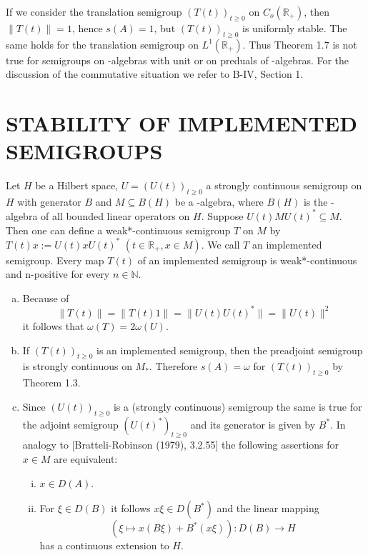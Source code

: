 \newpage

\begin{remark}\label{rem:d4-1.8}
If we consider the translation semigroup $(T(t))_{t \geq 0}$ on $C_{o}(\mathbb{R}_{+})$, then $\|T(t)\| = 1$, hence $s(A) = 1$, but $(T(t))_{t \geq 0}$ is uniformly stable.
The same holds for the translation semigroup on $L^1(\mathbb{R}_{+})$.
Thus Theorem 1.7 is not true for semigroups on \CA-algebras with unit or on preduals of \WA-algebras.
For the discussion of the commutative situation we refer to B-IV, Section 1.
\end{remark}

\section{STABILITY OF IMPLEMENTED SEMIGROUPS}

Let $H$ be a Hilbert space, $U = (U(t))_{t \geq 0}$ a strongly continuous semigroup on $H$ with generator $B$ and $M \subseteq B(H)$ be a \WA-algebra, where $B(H)$ is the \WA-algebra of all bounded linear operators on $H$.
Suppose $U(t)MU(t)^* \subseteq M$.
Then one can define a weak*-continuous semigroup $T$ on $M$ by $T(t)x := U(t)xU(t)^*$ $(t \in \mathbb{R}_{+}, x \in M)$.
We call $T$ an implemented semigroup.
Every map $T(t)$ of an implemented semigroup is weak*-continuous and n-positive for every $n \in \mathbb{N}$.

\begin{remarks}\label{rem:d4-2.1}
\begin{enumerate}[(a)]
\item
Because of
\[
\|T(t)\| = \|T(t)1\| = \|U(t)U(t)^*\| = \|U(t)\|^2
\]
it follows that $\omega(T) = 2\omega(U)$.

\item
If $(T(t))_{t \geq 0}$ is an implemented semigroup, then the preadjoint semigroup is strongly continuous on $M_{*}$.
Therefore $s(A) = \omega$ for $(T(t))_{t \geq 0}$ by Theorem 1.3.

\item
Since $(U(t))_{t \geq 0}$ is a (strongly continuous) semigroup the same is true for the adjoint semigroup $(U(t)^*)_{t \geq 0}$ and its generator is given by $B^*$.
In analogy to [Bratteli-Robinson (1979), 3.2.55] the following assertions for $x \in M$ are equivalent:

\begin{enumerate}[(i)]
\item
$x \in D(A)$.

\item
For $\xi \in D(B)$ it follows $x\xi \in D(B^*)$ and the linear mapping
\[
(\xi \mapsto x(B\xi)+B^*(x\xi)): D(B) \to H
\]
has a continuous extension to $H$.
\end{enumerate}
\end{enumerate}
\end{remarks}








